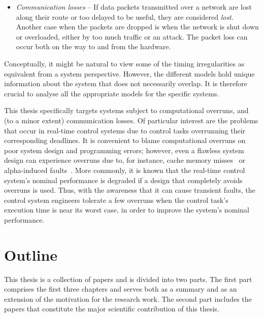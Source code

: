\begin{itemize}
    \item \emph{Communication losses} -- If data packets transmitted over a network are lost along their route or too delayed to be useful, they are considered \emph{lost}.
        Another case when the packets are dropped is when the network is shut down or overloaded, either by too much traffic or an attack.
        The packet loss can occur both on the way to and from the hardware.
\end{itemize}
%
Conceptually, it might be natural to view some of the timing irregularities as equivalent from a system perspective. 
However, the different models hold unique information about the system that does not necessarily overlap.
It is therefore crucial to analyse all the appropriate models for the specific systems.

This thesis specifically targets systems subject to computational overruns, and (to a minor extent) communication losses.
Of particular interest are the problems that occur in real-time control systems due to control tasks overrunning their corresponding deadlines.
It is convenient to blame computational overruns on poor system design and programming errors; however, even a flawless system design can experience overruns due to, for instance, cache memory misses~\addref{} or alpha-induced faults~\addref{}. 
More commonly, it is known that the real-time control system's nominal performance is degraded if a design that completely avoids overruns is used.
Thus, with the awareness that it can cause transient faults, the control system engineers tolerate a few overruns when the control task's execution time is near its worst case, in order to improve the system's nominal performance.



\section{Outline}%
\label{sec:intro:outline}%
%
This thesis is a collection of papers and is divided into two parts.
The first part comprises the first three chapters and serves both as a summary and as an extension of the motivation for the research work.
The second part includes the papers that constitute the major scientific contribution of this thesis.

